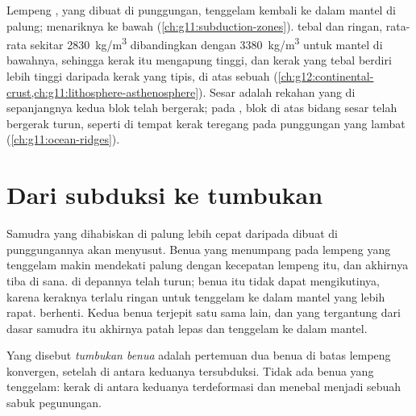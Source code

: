 \begin{recall}
Lempeng , yang dibuat di punggungan, tenggelam kembali ke dalam
mantel di palung;  menariknya ke bawah
(\cref{ch:g11:subduction-zones}).  tebal dan ringan, rata-rata
sekitar \qty{2830}{kg/m^3} dibandingkan dengan \qty{3380}{kg/m^3} untuk mantel
di bawahnya, sehingga kerak itu mengapung tinggi, dan kerak yang tebal berdiri
lebih tinggi daripada kerak yang tipis, di atas sebuah 
(\cref{ch:g12:continental-crust,ch:g11:lithosphere-asthenosphere}). Sesar
adalah rekahan yang di sepanjangnya kedua blok telah bergerak; pada , blok di atas bidang sesar telah bergerak turun, seperti di tempat kerak
teregang pada punggungan yang lambat (\cref{ch:g11:ocean-ridges}).
\end{recall}

\section{Dari subduksi ke tumbukan}

Samudra yang dihabiskan di palung lebih cepat daripada dibuat di punggungannya
akan menyusut. Benua yang menumpang pada lempeng yang tenggelam makin mendekati
palung dengan kecepatan lempeng itu, dan akhirnya tiba di sana.  di depannya telah turun; benua itu tidak dapat mengikutinya, karena
keraknya terlalu ringan untuk tenggelam ke dalam mantel yang lebih rapat.
 berhenti. Kedua benua terjepit satu sama lain, dan  yang
tergantung dari dasar samudra itu akhirnya patah lepas dan tenggelam ke dalam
mantel.

\begin{definition}\label{def:g12:mountain-building:collision}
Yang disebut \emph{tumbukan benua} adalah pertemuan dua
benua di batas lempeng konvergen, setelah  di antara keduanya
tersubduksi. Tidak ada benua yang tenggelam: kerak di antara keduanya
terdeformasi dan menebal menjadi sebuah sabuk pegunungan.
\end{definition}

